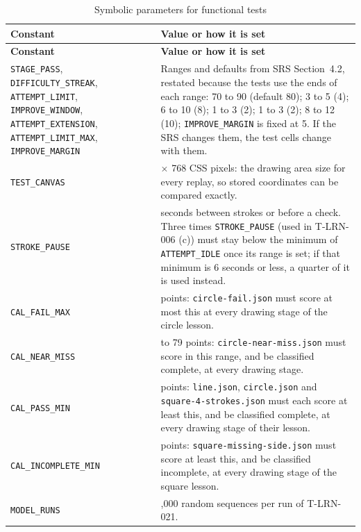 \documentclass[12pt, titlepage]{article}
\begin{document}
{\small
\begin{longtable}{@{}>{\raggedright\arraybackslash}p{}%
>{\raggedright\arraybackslash}p{}@{}}
\caption{Symbolic parameters for functional tests}
\label{tab:symb-fr}\\
\toprule
\textbf{Constant} & \textbf{Value or how it is set}\\
\midrule
\endfirsthead
\toprule
\textbf{Constant} & \textbf{Value or how it is set}\\
\midrule
\endhead
\texttt{STAGE\_PASS}, \texttt{DIFFICULTY\_STREAK}, \texttt{ATTEMPT\_LIMIT},
\texttt{IMPROVE\_WINDOW}, \texttt{ATTEMPT\_EXTENSION},
\texttt{ATTEMPT\_LIMIT\_MAX}, \texttt{IMPROVE\_MARGIN} & Ranges and
defaults from SRS Section~4.2, restated because the tests use the ends of
each range: 70 to 90 (default 80); 3 to 5 (4); 6 to 10 (8); 1 to 3 (2); 1
to 3 (2); 8 to 12 (10); \texttt{IMPROVE\_MARGIN} is fixed at 5. If the SRS
changes them, the test cells change with them.\\
\addlinespace
\texttt{TEST\_CANVAS} & 1024 $\times$ 768 CSS pixels: the drawing area size
for every replay, so stored coordinates can be compared exactly.\\
\addlinespace
\texttt{STROKE\_PAUSE} & 2 seconds between strokes or before a check. Three
times \texttt{STROKE\_PAUSE} (used in T-LRN-006 (c)) must stay below the
minimum of \texttt{ATTEMPT\_IDLE} once its range is set; if that
minimum is 6 seconds or less, a quarter of it is used instead.\\
\addlinespace
\texttt{CAL\_FAIL\_MAX} & 60 points:
\texttt{circle-\allowbreak{}fail.json} must score at most this at every
drawing stage of the circle lesson.\\
\addlinespace
\texttt{CAL\_NEAR\_MISS} & 70 to 79 points:
\texttt{circle-\allowbreak{}near-\allowbreak{}miss.json} must score in this
range, and be classified complete, at every drawing stage.\\
\addlinespace
\texttt{CAL\_PASS\_MIN} & 90 points: \texttt{line.json},
\texttt{circle.json} and
\texttt{square-\allowbreak{}4-\allowbreak{}strokes.json} must each score at
least this, and be classified complete, at every drawing stage of their
lesson.\\
\addlinespace
\texttt{CAL\_INCOMPLETE\_MIN} & 70 points:
\texttt{square-\allowbreak{}missing-\allowbreak{}side.json} must score at
least this, and be classified incomplete, at every drawing stage of the
square lesson.\\
\addlinespace
\texttt{MODEL\_RUNS} & 1,000 random sequences per run of T-LRN-021.\\

\end{longtable}}
\end{document}
